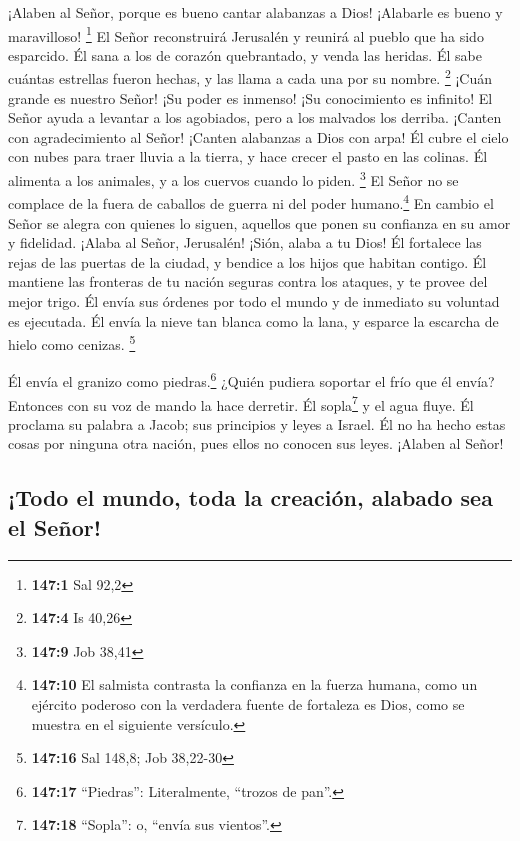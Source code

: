  ¡Alaben al Señor, porque es bueno cantar alabanzas a
Dios! ¡Alabarle es bueno y maravilloso! \footnote{\textbf{147:1} Sal
  92,2}  El Señor reconstruirá Jerusalén y reunirá al
pueblo que ha sido esparcido.  Él sana a los de corazón
quebrantado, y venda las heridas.  Él sabe cuántas
estrellas fueron hechas, y las llama a cada una por su nombre.
\footnote{\textbf{147:4} Is 40,26}  ¡Cuán grande es
nuestro Señor! ¡Su poder es inmenso! ¡Su conocimiento es infinito!
 El Señor ayuda a levantar a los agobiados, pero a los
malvados los derriba.  ¡Canten con agradecimiento al
Señor! ¡Canten alabanzas a Dios con arpa!  Él cubre el
cielo con nubes para traer lluvia a la tierra, y hace crecer el pasto en
las colinas.  Él alimenta a los animales, y a los cuervos
cuando lo piden. \footnote{\textbf{147:9} Job 38,41}  El
Señor no se complace de la fuera de caballos de guerra ni del poder
humano.\footnote{\textbf{147:10} El salmista contrasta la confianza en
  la fuerza humana, como un ejército poderoso con la verdadera fuente de
  fortaleza es Dios, como se muestra en el siguiente versículo.}
 En cambio el Señor se alegra con quienes lo siguen,
aquellos que ponen su confianza en su amor y fidelidad. 
¡Alaba al Señor, Jerusalén! ¡Sión, alaba a tu Dios!  Él
fortalece las rejas de las puertas de la ciudad, y bendice a los hijos
que habitan contigo.  Él mantiene las fronteras de tu
nación seguras contra los ataques, y te provee del mejor trigo.
 Él envía sus órdenes por todo el mundo y de inmediato su
voluntad es ejecutada.  Él envía la nieve tan blanca como
la lana, y esparce la escarcha de hielo como cenizas. \footnote{\textbf{147:16}
  Sal 148,8; Job 38,22-30}

 Él envía el granizo como piedras.\footnote{\textbf{147:17}
  ``Piedras'': Literalmente, ``trozos de pan''.} ¿Quién pudiera soportar
el frío que él envía?  Entonces con su voz de mando la
hace derretir. Él sopla\footnote{\textbf{147:18} ``Sopla'': o, ``envía
  sus vientos''.} y el agua fluye.  Él proclama su
palabra a Jacob; sus principios y leyes a Israel.  Él no
ha hecho estas cosas por ninguna otra nación, pues ellos no conocen sus
leyes. ¡Alaben al Señor!

\hypertarget{todo-el-mundo-toda-la-creaciuxf3n-alabado-sea-el-seuxf1or}{%
\subsection{¡Todo el mundo, toda la creación, alabado sea el
Señor!}\label{todo-el-mundo-toda-la-creaciuxf3n-alabado-sea-el-seuxf1or}}

